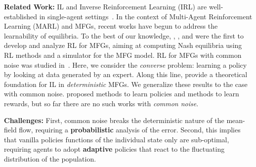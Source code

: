 \documentclass{article}
\theoremstyle{plain}
\begin{document}
\noindent\textbf{Related Work:} 
IL and Inverse Reinforcement Learning (IRL) are well-established in single-agent settings~\citep{ng2000algorithms,ho2016generative}. In the context of Multi-Agent Reinforcement Learning (MARL) and MFGs, recent works have begun to address the learnability of equilibria. To the best of our knowledge, \citet{subramanian2019reinforcement},  \citet{guo2019learningMFG}, and \citet{elie2020convergence} were the first to develop and analyze RL for MFGs, aiming at computing Nash equilibria using RL methods and a simulator for the MFG model. RL for MFGs with common noise was studied in~\citep{perrin2020fictitious,wu2025population}. Here, we consider the \emph{converse} problem: learning a policy by looking at data generated by an expert. Along this line, \citet{ramponi2023imitation} provide a theoretical foundation for IL in \emph{deterministic} MFGs. We generalize these results to the case with common noise.\citep{Anahtarci2025MaxCausalEntropyMFG,Chen2022IndividualIRLMFG,Zhao2025MeanFieldCorrelatedIL} proposed methods to learn policies and \cite{Chen2024MetaIRLMFG} methods to learn rewards, but so far there are no such works with \emph{common noise}.

\noindent\textbf{Challenges:} 
First, common noise breaks the deterministic nature of the mean-field flow, requiring a \textbf{probabilistic} analysis of the error. Second, this implies that vanilla policies functions of the individual state only are sub-optimal, 
requiring agents to adopt \textbf{adaptive} policies that react to the fluctuating distribution of the population.
\end{document}
